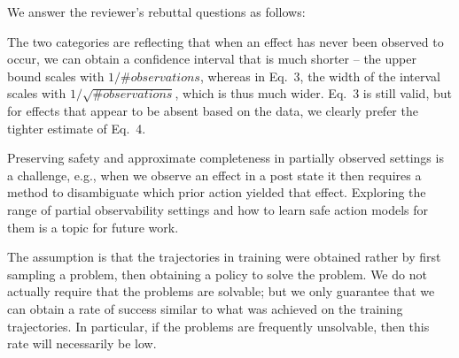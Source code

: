 \documentclass[letterpaper]{article} %
\begin{document}
\noindent We answer the reviewer's rebuttal questions as follows:
\begin{compactenum}
    \item The two categories are reflecting that when an effect has never been observed to occur, we can obtain a confidence interval that is much shorter -- the upper bound scales with $1/\# observations$, whereas in Eq.~3, the width of the interval scales with $1/\sqrt{\# observations}$, which is thus much wider. Eq.\ 3 is still valid, but for effects that appear to be absent based on the data, we clearly prefer the tighter estimate of Eq.~4.



\item Preserving safety and approximate completeness in partially observed settings is a challenge, e.g., when we observe an effect in a post state it then requires a method to  disambiguate which prior action yielded that effect. Exploring the range of partial observability settings and how to learn safe action models for them is a topic for future work.

\item The assumption is that the trajectories in training were obtained rather by first sampling a problem, then obtaining a policy to solve the problem. We do not actually require that the problems are solvable; but we only guarantee that we can obtain a rate of success similar to what was achieved on the training trajectories. In particular, if the problems are frequently unsolvable, then this rate will necessarily be low.



\end{compactenum}
\end{document}
